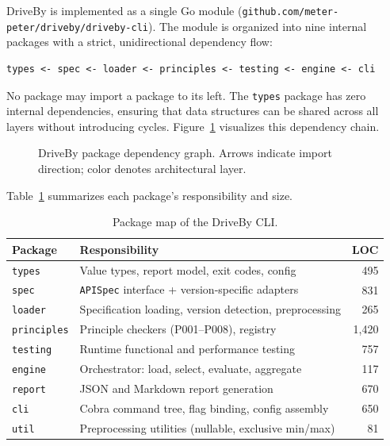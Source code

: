 DriveBy is implemented as a single Go module (\texttt{github.com/meter-peter/driveby/driveby-cli}). The module is organized into nine internal packages with a strict, unidirectional dependency flow:

\begin{verbatim}
types <- spec <- loader <- principles <- testing <- engine <- cli
\end{verbatim}

No package may import a package to its left. The \texttt{types} package has zero internal dependencies, ensuring that data structures can be shared across all layers without introducing cycles. Figure~\ref{fig:dependency-flow} visualizes this dependency chain.

\begin{figure}[htbp]
\centering

\caption{DriveBy package dependency graph. Arrows indicate import direction; color denotes architectural layer.}
\label{fig:dependency-flow}
\end{figure}

Table~\ref{tab:package-map} summarizes each package's responsibility and size.

\begin{table}[htbp]
\centering
\caption{Package map of the DriveBy CLI.}
\label{tab:package-map}
\small
\begin{tabular}{@{}llr@{}}
\toprule
\textbf{Package} & \textbf{Responsibility} & \textbf{LOC} \\
\midrule
\texttt{types}      & Value types, report model, exit codes, config     & 495 \\
\texttt{spec}       & \texttt{APISpec} interface + version-specific adapters     & 831 \\
\texttt{loader}     & Specification loading, version detection, preprocessing & 265 \\
\texttt{principles} & Principle checkers (P001--P008), registry        & 1{,}420 \\
\texttt{testing}    & Runtime functional and performance testing        & 757 \\
\texttt{engine}     & Orchestrator: load, select, evaluate, aggregate   & 117 \\
\texttt{report}     & JSON and Markdown report generation               & 670 \\
\texttt{cli}        & Cobra command tree, flag binding, config assembly & 650 \\
\texttt{util}       & Preprocessing utilities (nullable, exclusive min/max) & 81 \\
\bottomrule
\end{tabular}
\end{table}

